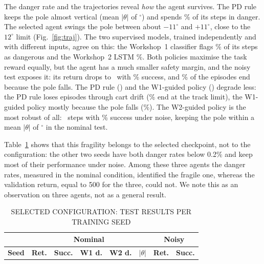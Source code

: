 \documentclass[conference]{IEEEtran}
\begin{document}
The danger rate and the trajectories reveal \emph{how} the agent survives. The PD rule
keeps the pole almost vertical (mean $|\theta|$ of \TestPDTheta$^\circ$) and spends
\TestPDDanger\% of its steps in danger. The selected agent swings the pole between about
$-11^\circ$ and $+11^\circ$, close to the $12^\circ$ limit (Fig.~\ref{fig:traj}). The two
supervised models, trained independently and with different inputs, agree on this: the
Workshop~1 classifier flags \TestDQNDanger\% of its steps as dangerous and the Workshop~2
LSTM \TestDQNDangerWTwo\%. Both policies maximise the task reward equally, but the agent
has a much smaller safety margin, and the noisy test exposes it: its return drops to
\NoisyDQNMean\ with \NoisyDQNSuccess\% success, and \NoisyDQNThetaFail\% of the episodes
end because the pole falls. The PD rule (\NoisyPDMean) and the W1-guided policy
(\NoisyWOneMean) degrade less: the PD rule loses episodes through cart drift
(\NoisyPDXFail\% end at the track limit), the W1-guided policy mostly because the pole
falls (\NoisyWOneThetaFail\%). The W2-guided policy is the
most robust of all: \NoisyWTwoMean\ steps with \NoisyWTwoSuccess\% success under noise,
keeping the pole within a mean $|\theta|$ of \TestWTwoTheta$^\circ$ in the nominal test.

Table~\ref{tab:seeds} shows that this fragility belongs to the selected checkpoint,
not to the configuration: the other two seeds have both danger rates below 0.2\% and
keep most of their performance under noise. Among these three agents the danger rates,
measured in the nominal condition, identified the fragile one, whereas the validation
return, equal to 500 for the three, could not. We note this as an observation on three
agents, not as a general result.

\begin{table}[t]
\caption{SELECTED CONFIGURATION: TEST RESULTS PER TRAINING SEED}
\label{tab:seeds}
\centering
\small
\setlength{\tabcolsep}{3pt}
\begin{tabular}{|l|c|c|c|c|c||c|c|}
\hline
& \multicolumn{5}{c||}{\textbf{Nominal}} & \multicolumn{2}{c|}{\textbf{Noisy}} \\ \hline
\textbf{Seed} & \textbf{Ret.} & \textbf{Succ.} & \textbf{W1 d.} & \textbf{W2 d.} & $|\theta|$ & \textbf{Ret.} & \textbf{Succ.} \\ \hline

\end{tabular}
\end{table}
\end{document}
